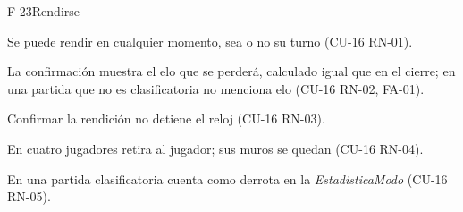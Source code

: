 \begin{prototipocrud}{F-23}{Rendirse}
{\begin{crudlista}
    \item Se puede rendir en cualquier momento, sea o no su turno (\mbox{CU-16} \mbox{RN-01}).
    \item La confirmación muestra el elo que se perderá, calculado igual que en el cierre; en una partida que no es clasificatoria no menciona elo (\mbox{CU-16} \mbox{RN-02}, \mbox{FA-01}).
    \item Confirmar la rendición no detiene el reloj (\mbox{CU-16} \mbox{RN-03}).
    \item En cuatro jugadores retira al jugador; sus muros se quedan (\mbox{CU-16} \mbox{RN-04}).
    \item En una partida clasificatoria cuenta como derrota en la \textit{EstadisticaModo} (\mbox{CU-16} \mbox{RN-05}).
  \end{crudlista}}
\end{prototipocrud}


